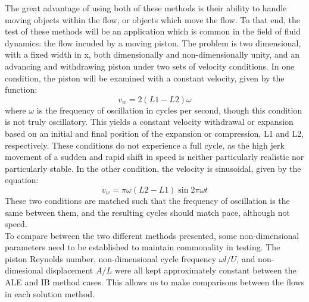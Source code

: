 \documentclass{article}
\begin{document}
The great advantage of using both of these methods is their ability to handle moving objects within the flow, or objects which move the flow.  To that end, the test of these methods will be an application which is common in the field of fluid dynamics: the flow incuded by a moving piston.  The problem is two dimensional, with a fixed width in x, both dimensionally and non-dimensionally unity, and an advancing and withdrawing piston under two sets of velocity conditions.  In one condition, the piston will be examined with a constant velocity, given by the function:
\begin{equation}
  v_w = 2 (L1-L2) \omega
\end{equation}
where $\omega$ is the frequency of oscillation in cycles per second, though this condition is not truly oscillatory.  This yields a constant velocity withdrawal or expansion based on an initial and final position of the expansion or compression, L1 and L2, respectively.  These conditions do not experience a full cycle, as the high jerk movement of a sudden and rapid shift in speed is neither particularly realistic nor particularly stable.  In the other condition, the velocity is sinusoidal, given by the equation:
\begin{equation}
  v_w = \pi \omega (L2-L1) \sin{2 \pi \omega t}
\end{equation}
These two conditions are matched such that the frequency of oscillation is the same between them, and the resulting cycles should match pace, although not speed.  
\\
To compare between the two different methods presented, some non-dimensional parameters need to be established to maintain commonality in testing.  The piston Reynolds number, non-dimensional cycle frequency $\omega l/U$, and non-dimesional displacement $A/L$ were all kept approximately constant between the ALE and IB method cases.  This allows us to make comparisons between the flows in each solution method.
\end{document}
